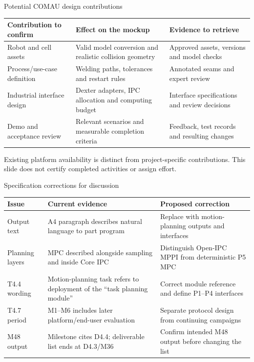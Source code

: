 \documentclass[aspectratio=169,10pt]{beamer}
\begin{document}
\begin{frame}{Potential COMAU design contributions}
\small\renewcommand{\arraystretch}{1.3}
\begin{tabularx}{\textwidth}{@{}p{}XX@{}}
\toprule
Contribution to confirm & Effect on the mockup & Evidence to retrieve\\\midrule
Robot and cell assets & Valid model conversion and realistic collision geometry & Approved assets, versions and model checks\\
Process/use-case definition & Welding paths, tolerances and restart rules & Annotated seams and expert review\\
Industrial interface design & Dexter adapters, IPC allocation and computing budget & Interface specifications and review decisions\\
Demo and acceptance review & Relevant scenarios and measurable completion criteria & Feedback, test records and resulting changes\\\bottomrule
\end{tabularx}\par\medskip\small Existing platform availability is distinct from project-specific contributions. This slide does not certify completed activities or assign effort.
\end{frame}

\begin{frame}{Specification corrections for discussion}
\small\renewcommand{\arraystretch}{1.25}
\begin{tabularx}{\textwidth}{@{}p{}XX@{}}
\toprule
Issue & Current evidence & Proposed correction\\\midrule
Output text & A4 paragraph describes natural language to part program & Replace with motion-planning outputs and interfaces\\
Planning layers & MPC described alongside sampling and inside Core IPC & Distinguish Open-IPC MPPI from deterministic P5 MPC\\
T4.4 wording & Motion-planning task refers to deployment of the ``task planning module'' & Correct module reference and define P1--P4 interfaces\\
T4.7 period & M1--M6 includes later platform/end-user evaluation & Separate protocol design from continuing campaigns\\
M48 output & Milestone cites D4.4; deliverable list ends at D4.3/M36 & Confirm intended M48 output before changing the list\\\bottomrule
\end{tabularx}
\end{frame}
\end{document}
